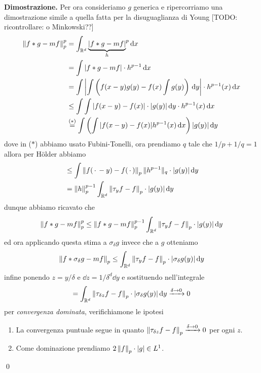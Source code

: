 \documentclass[a4paper, 12pt]{report}
\begin{document}
\textbf{Dimostrazione.}
Per ora consideriamo $g$ generica e ripercorriamo una dimostrazione simile a quella fatta per la disuguaglianza di Young [TODO: ricontrollare: o Minkowski??]
$$
\begin{aligned}
	\left\lVert f \ast g - m f \right\rVert_p^p 
	&= \int_{\mathbb R^d} {\underbrace{|f \ast g - m f|}_h}^p \,\mathrm{d} x \\
	&= \int |f \ast g - m f| \cdot h^{p-1} \,\mathrm{d} x \\
	&= \int \left| \int \left( f(x - y) g(y) - f(x) \int g(y) \right) \,\mathrm{d} y \right| \cdot h^{p-1}(x) \,\mathrm{d} x \\
	&\leq \int \int |f(x - y) - f(x)| \cdot |g(y)| \,\mathrm{d} y \cdot h^{p-1}(x) \,\mathrm{d} x \\
	&\overset{\text{($*$)}}{=} \int \left(\int |f(x - y) - f(x)| h^{p-1}(x) \,\mathrm{d} x \right) |g(y)| \,\mathrm{d} y
\end{aligned}
$$
dove in ($*$) abbiamo usato Fubini-Tonelli, ora prendiamo $q$ tale che $1/p + 1/q = 1$ allora per H\"older abbiamo
$$
\begin{aligned}
	&\leq \int \left\lVert f(\,\cdot\, - y) - f(\,\cdot\,) \right\rVert_p \| h^{p-1} \|_q \cdot |g(y)| \,\mathrm{d} y \\
	&= \left\lVert h \right\rVert_p^{p-1} \int_{\mathbb R^d} \left\lVert \tau_y f - f \right\rVert_p \cdot |g(y)| \,\mathrm{d} y \\
\end{aligned}
$$
dunque abbiamo ricavato che
$$
\left\lVert f \ast g - m f \right\rVert_p^p 
\leq \left\lVert f \ast g - m f \right\rVert_p^{p-1} \int_{\mathbb R^d} \left\lVert \tau_y f - f \right\rVert_p \cdot |g(y)| \,\mathrm{d} y
$$
ed ora applicando questa stima a $\sigma_\delta g$ invece che a $g$ otteniamo
$$
\left\lVert f \ast \sigma_\delta g - m f \right\rVert_p
\leq \int_{\mathbb R^d} \left\lVert \tau_y f - f \right\rVert_p \cdot |\sigma_\delta g(y)| \,\mathrm{d} y
$$
infine ponendo $z = y / \delta$ e $\dd z = 1/\delta^d \dd y$ e sostituendo nell'integrale
$$
= \int_{\mathbb R^d} \left\lVert \tau_{\delta z} f - f \right\rVert_p \cdot |\sigma_\delta g(y)| \,\mathrm{d} y \xrightarrow{\delta \to 0} 0
$$
per \textit{convergenza dominata}, verifichiamone le ipotesi
\begin{enumerate}
	\item La convergenza puntuale segue in quanto $\left\lVert \tau_{\delta z} f - f \right\rVert_p \xrightarrow{\delta \to 0} 0$ per ogni $z$.
	\item Come dominazione prendiamo $2 \left\lVert f \right\rVert_p \cdot |g| \in L^1$.
\end{enumerate}
\qed
\end{document}
